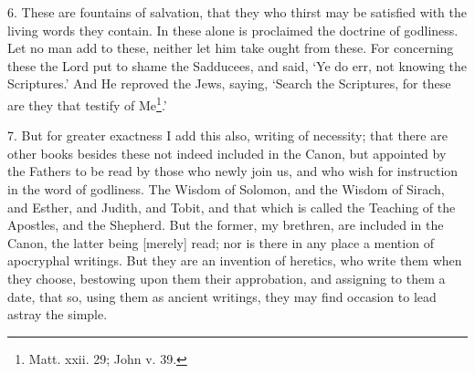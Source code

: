 6. These are fountains of salvation, that they who thirst may be satisfied with the living words they contain. In these alone is proclaimed the doctrine of godliness. Let no man add to these, neither let him take ought from these. For concerning these the Lord put to shame the Sadducees, and said, ‘Ye do err, not knowing the Scriptures.’ And He reproved the Jews, saying, ‘Search the Scriptures, for these are they that testify of Me\footnote{Matt. xxii. 29; John v. 39.}.’

7. But for greater exactness I add this also, writing of necessity; that there are other books besides these not indeed included in the Canon, but appointed by the Fathers to be read by those who newly join us, and who wish for instruction in the word of godliness. The Wisdom of Solomon, and the Wisdom of Sirach, and Esther, and Judith, and Tobit, and that which is called the Teaching of the Apostles, and the Shepherd. But the former, my brethren, are included in the Canon, the latter being [merely] read; nor is there in any place a mention of apocryphal writings. But they are an invention of heretics, who write them when they choose, bestowing upon them their approbation, and assigning to them a date, that so, using them as ancient writings, they may find occasion to lead astray the simple.
